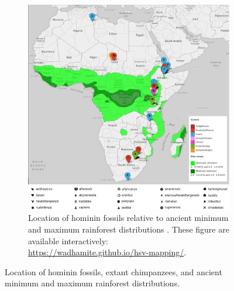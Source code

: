 \documentclass[fleqn,10pt]{wlscirep}
\begin{document}
\begin{figure}
\ContinuedFloat
\begin{subfigure}[b]{\textwidth}
  \centering
  \includegraphics[width=\textwidth]{figs/rainforest}
  \caption{Location of hominin fossils relative to ancient minimum and maximum rainforest distributions \citep{Peel2007}. These figure are available interactively: \url{https://wadhamite.github.io/hsv-mapping/}.}
  \label{fig:rainforest}
\end{subfigure}
  \caption{Location of hominin fossils, extant chimpanzees, and ancient minimum and maximum rainforest distributions.}
\end{figure}
\end{document}
